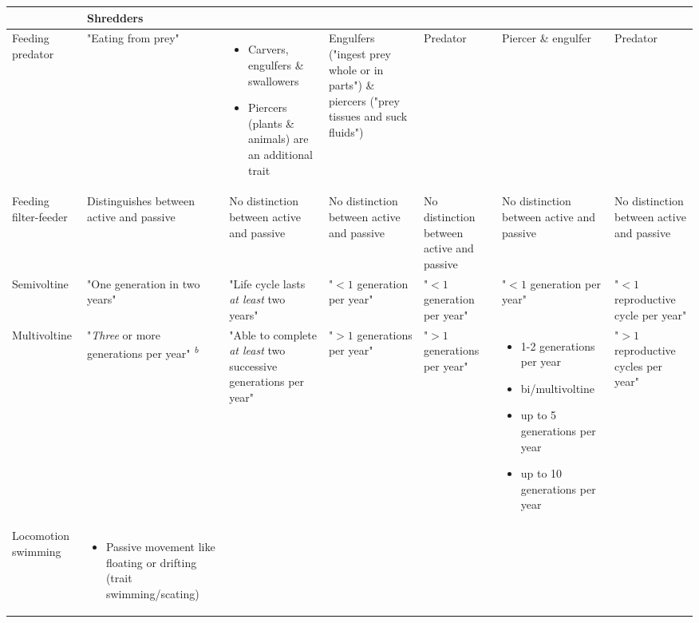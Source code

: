 \documentclass[../Draft_harmonization_paper.tex]{subfiles}
\begin{document}
\begin{landscape}
\begin{longtable}{m{1.8cm}|m{3cm}|m{3cm}|m{3cm}|m{3cm}|m{3.2cm}|m{3cm}}
\begin{itemize}
        \end{itemize} & 
        Shredders
        \\ 
        \midrule
        Feeding predator & 
        "Eating from prey" & 
        \begin{itemize}
            \item Carvers, engulfers \& swallowers
            \item Piercers (plants \& animals) are an additional trait
        \end{itemize} & %
        Engulfers ("ingest prey whole or in parts") \& 
        piercers ("prey tissues and suck fluids") & 
        Predator &
        Piercer \& engulfer &
        Predator
        \\ 
        \midrule
        Feeding filter-feeder & 
        Distinguishes between active and passive &
        No distinction between active and passive &
        No distinction between active and passive &
        No distinction between active and passive &
        No distinction between active and passive &
        No distinction between active and passive
        \\
        \toprule[.1em]
        Semivoltine & 
        "One generation in two years" & 
        "Life cycle lasts \textit{at least} two years" & 
        "$< 1$ generation per year" & 
        "$< 1$ generation per year" & 
        "$< 1$ generation per year" & 
        "$< 1$ reproductive cycle per year"
        \\
        \midrule
        Multivoltine & 
        "\textit{Three} or more generations per year" \textsuperscript{\textit{b}}& 
        "Able to complete \textit{at least} two successive generations per year" &
        "$> 1$ generations per year" &
        "$> 1$ generations per year" & 
        \begin{itemize}
            \item 1-2 generations per year
            \item bi/multivoltine
            \item up to 5 generations per year
            \item up to 10 generations per year
        \end{itemize}
        & 
        "$> 1$ reproductive cycles per year"
        \\
        \toprule[.1em]
        Locomotion swimming & 
        \begin{itemize}
            \item Passive movement like floating or drifting (trait swimming/scating)

\end{itemize}
\end{longtable}
\end{landscape}
\end{document}
